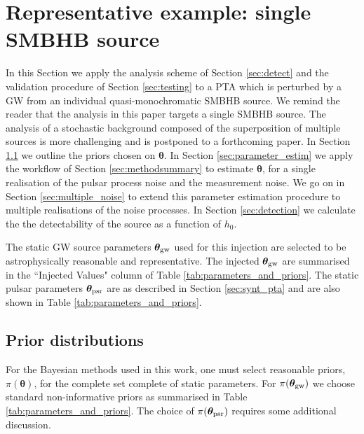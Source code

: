 \documentclass[fleqn,usenatbib,useAMS]{mnras}
\begin{document}
\section{Representative example: single SMBHB source}\label{sec:rep_example}
In this Section we apply the analysis scheme of Section \ref{sec:detect} and the validation procedure of Section \ref{sec:testing} to a PTA which is perturbed by a GW from an individual quasi-monochromatic SMBHB source. We remind the reader that the analysis in this paper targets a single SMBHB source. The analysis of a stochastic background composed of the superposition of multiple sources is more challenging and is postponed to a forthcoming paper. In Section \ref{sec:priors} we outline the priors chosen on $\boldsymbol{\theta}$. In Section \ref{sec:parameter_estim} we apply the workflow of Section \ref{sec:methodsummary} to estimate $\boldsymbol{\theta}$, for a single realisation of the pulsar process noise and the measurement noise. We go on in Section \ref{sec:multiple_noise} to extend this parameter estimation procedure to multiple realisations of the noise processes. In Section \ref{sec:detection} we calculate the the detectability of the source as a function of $h_0$. \newline


The static GW source parameters $\boldsymbol{\theta}_{\rm gw}$ used for this injection are selected to be astrophysically reasonable and representative. The injected $\boldsymbol{\theta}_{\rm gw}$ are summarised in the ``Injected Values" column of Table \ref{tab:parameters_and_priors}. The static pulsar parameters $\boldsymbol{\theta}_{\rm psr}$ are as described in Section \ref{sec:synt_pta} and are also shown in Table \ref{tab:parameters_and_priors}. 

\subsection{Prior distributions}\label{sec:priors}
For the Bayesian methods used in this work, one must select reasonable priors, $\pi(\boldsymbol{\theta})$, for the complete set complete of static parameters. For $\pi(\boldsymbol{\theta}_{\rm gw})$ we choose standard non-informative priors \citep[e.g.][]{Bhagwat2021} as summarised in Table \ref{tab:parameters_and_priors}. The choice of $\pi(\boldsymbol{\theta}_{\rm psr})$ requires some additional discussion. \newline 
\end{document}
